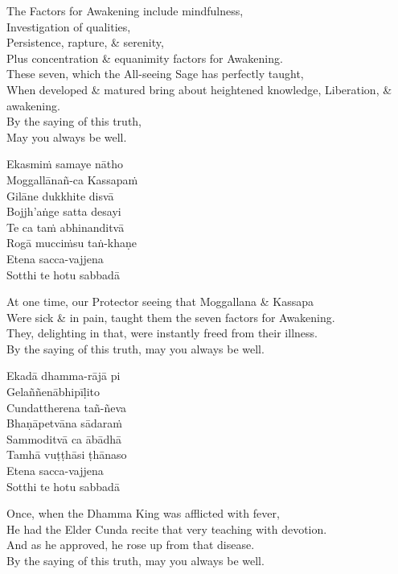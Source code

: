 \begin{english-verses}
  The Factors for Awakening include mindfulness,\\
  Investigation of qualities,\\
  Persistence, rapture, \& serenity,\\
  Plus concentration \& equanimity factors for Awakening.\\
  These seven, which the All-seeing Sage has perfectly taught,\\
  When developed \& matured bring about heightened knowledge, Liberation, \& awakening.\\
  By the saying of this truth,\\
  May you always be well.
\end{english-verses}

Ekasmiṁ samaye nātho\\
Moggallānañ-ca Kassapaṁ\\
Gilāne dukkhite disvā\\
Bojjh'aṅge satta desayi\\
Te ca taṁ abhinanditvā\\
Rogā mucciṁsu taṅ-khaṇe\\
Etena sacca-vajjena\\
Sotthi te hotu sabbadā

\begin{english-verses}
  At one time, our Protector seeing that Moggallana \& Kassapa\\
  Were sick \& in pain, taught them the seven factors for Awakening.\\
  They, delighting in that, were instantly freed from their illness.\\
  By the saying of this truth, may you always be well.
\end{english-verses}

Ekadā dhamma-rājā pi\\
Gelaññenābhipīḷito\\
Cundattherena tañ-ñeva\\
Bhaṇāpetvāna sādaraṁ\\
Sammoditvā ca ābādhā\\
Tamhā vuṭṭhāsi ṭhānaso\\
Etena sacca-vajjena\\
Sotthi te hotu sabbadā

\begin{english}
  Once, when the Dhamma King was afflicted with fever,\\
  He had the Elder Cunda recite that very teaching with devotion.\\
  And as he approved, he rose up from that disease.\\
  By the saying of this truth, may you always be well.
\end{english}

